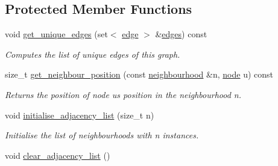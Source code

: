 \subsection*{Protected Member Functions}
\begin{DoxyCompactItemize}
\item 
void \hyperlink{classlgraph_1_1utils_1_1udgraph_a26dbf1e2606613bd392e670e81d38a60}{get\+\_\+unique\+\_\+edges} (set$<$ \hyperlink{namespacelgraph_1_1utils_a6510284ce1b1ae5dc97ce5d2de426e10}{edge} $>$ \&\hyperlink{classlgraph_1_1utils_1_1uxgraph_ade877f3a9cf71d844cfe7b6c4f8aae10}{edges}) const 
\begin{DoxyCompactList}\small\item\em Computes the list of unique edges of this graph. \end{DoxyCompactList}\item 
size\+\_\+t \hyperlink{classlgraph_1_1utils_1_1xxgraph_aac7ef2134cad9529869f1334de7892d9}{get\+\_\+neighbour\+\_\+position} (const \hyperlink{namespacelgraph_1_1utils_a0f2ef47028a466d26841709e705390ac}{neighbourhood} \&n, \hyperlink{namespacelgraph_1_1utils_a7bd66ede3805ef121bc2835bd48de0cf}{node} u) const 
\begin{DoxyCompactList}\small\item\em Returns the position of node {\itshape u\textquotesingle{}s} position in the neighbourhood {\itshape n}. \end{DoxyCompactList}\item 
void \hyperlink{classlgraph_1_1utils_1_1xxgraph_a2201aaff5e9ffa29a9b3abfde705dd46}{initialise\+\_\+adjacency\+\_\+list} (size\+\_\+t n)\hypertarget{classlgraph_1_1utils_1_1xxgraph_a2201aaff5e9ffa29a9b3abfde705dd46}{}\label{classlgraph_1_1utils_1_1xxgraph_a2201aaff5e9ffa29a9b3abfde705dd46}

\begin{DoxyCompactList}\small\item\em Initialise the list of neighbourhoods with {\itshape n} instances. \end{DoxyCompactList}\item 
void \hyperlink{classlgraph_1_1utils_1_1xxgraph_a6523402d0ec66918b95de23d2bee38fc}{clear\+\_\+adjacency\+\_\+list} ()\hypertarget{classlgraph_1_1utils_1_1xxgraph_a6523402d0ec66918b95de23d2bee38fc}{}\label{classlgraph_1_1utils_1_1xxgraph_a6523402d0ec66918b95de23d2bee38fc}


\end{DoxyCompactItemize}
